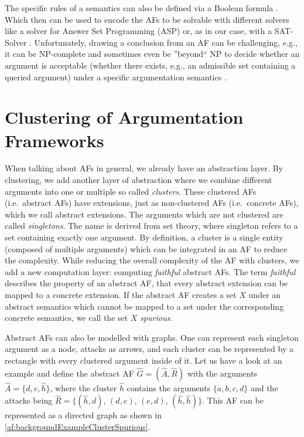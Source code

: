 The specific rules of a semantics can also be defined via a Boolean formula \cite{inproceedingsBesnardDoutreBooleanFormulaSemantics}. Which then can be used to encode the AFs to be solvable with different solvers like a solver for Answer Set Programming (ASP) \cite{BrewkaET11, DBLP:journals/argcom/EglyGW10} or, as in our case, with a SAT-Solver \cite{BacchusJM21}. Unfortunately, drawing a conclusion from an AF can be challenging, e.g., it can be NP-complete and sometimes even be ''beyond`` NP to decide whether an argument is acceptable (whether there exists, e.g., an admissible set containing a queried argument) under a specific argumentation semantics \cite{DvorakD18}.



\section{Clustering of Argumentation Frameworks}
\label{sec:ClusteringOfArgumentationFrameworks}

When talking about AFs in general, we already have an abstraction layer. By clustering, we add another layer of abstraction where we combine different arguments into one or multiple so called \emph{clusters}. These clustered AFs (i.e.\ abstract AFs) have extensions, just as non-clustered AFs (i.e.\ concrete AFs), which we call abstract extensions. The arguments which are not clustered are called \emph{singletons}. The name is derived from set theory, where singleton refers to a set containing exactly one argument.
By definition, a cluster is a single entity (composed of multiple arguments) which can be integrated in an AF to reduce the complexity. While reducing the overall complexity of the AF with clusters, we add a new computation layer: computing \emph{faithful} abstract AFs. The term \emph{faithful} describes the property of an abstract AF, that every abstract extension can be mapped to a concrete extension. If the abstract AF creates a set $X$ under an abstract semantics which cannot be mapped to a set under the corresponding concrete semantics, we call the set $X$ \emph{spurious}.

Abstract AFs can also be modelled with graphs. One can represent each singleton argument as a node, attacks as arrows, and each cluster can be represented by a rectangle with every clustered argument inside of it. Let us have a look at an example and define the abstract AF $\hat{G}=(\hat{A}, \hat{R})$ with the arguments $\hat{A}=\{d, e, \hat{h}\}$, where the cluster $\hat{h}$ contains the arguments $\{a, b, c, d\}$ and the attacks being $\hat{R}=\bigl\{(\hat{h}, d)$, $(d, e)$, $(e, d)$, $(\hat{h},\hat{h})\bigl\}$.  This AF can be represented as a directed graph as shown in \cref{af:backgroundExampleClusterSpurious}.


